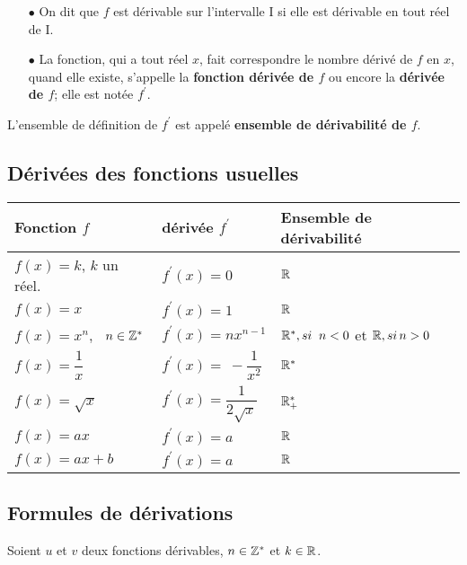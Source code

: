\begin{definition}

\begin{enumerate}
\item[$  \bullet$] 
On dit que $f$  est dérivable sur  l'intervalle I  si elle est dérivable en tout réel de I.

\item[$  \bullet$] La fonction, qui a tout réel $ x $, fait correspondre le nombre dérivé de $f$  en $ x $, quand elle existe,\; s'appelle la
\textbf{fonction dérivée de $f$}  ou encore la   \textbf{dérivée de $f$};  elle est notée $f^{\prime} $.
\end{enumerate}

\end{definition}
 
L'ensemble de définition de $ f^{\prime} $ est appelé  \textbf{ ensemble de dérivabilité de $ f $}.

\subsection{Dérivées des fonctions usuelles}

 \begin{center}
\begin{tabularx}{\textwidth}{|X|X|X|}
\hline
\textbf{Fonction} $f$  &\textbf{ dérivée  } $f^{\prime} $ & \textbf{ Ensemble de dérivabilité} \\ 
\hline
$f(x)= k $,\; \;  $k$  un réel.  & $ f^{\prime}(x)=0 $& $ \mathbb{R} $   \\
\hline
$f(x)= x$   & $f^{\prime}(x)=1 $   & $ \mathbb{R} $  \\
\hline
$f(x)= x^{n} $,\ \;  $n \in \mathbb{Z}^*$    & $ f^{\prime}(x)=n x^{n-1} $ &  $ \mathbb{R}^*, si\;\; n<0 $ \; et\;  $ \mathbb{R}, si\,n>0 $   \\
\hline
$f(x)= \dfrac{1}{x} $  & $ f^{\prime}(x)=~-\dfrac{1}{x^{2}} $  &  $\mathbb{R}^* $   \\
\hline
$f(x)= \sqrt{x} $  &  $f^{\prime}(x)= \dfrac{1}{2\sqrt{x}} $ &  $\mathbb{R}_+^*$  \\
\hline
$f(x)= ax $    & $ f^{\prime}(x)=a $ &  $\mathbb{R}$   \\
\hline
$f(x)=ax+b $    & $f^{\prime}(x)=a $  &  $\mathbb{R}$  \\
\hline
\end{tabularx}
\end{center}


\bigskip
\subsection{Formules de dérivations}
Soient $u $ et $v $ deux fonctions dérivables, \; $ n\in\mathbb{Z}^* $ \; et\;  $ k\in\mathbb{R} $.\\


